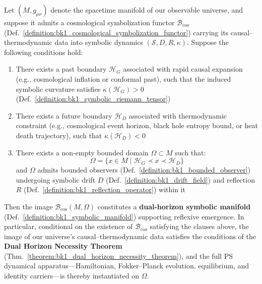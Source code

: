 \begin{theorem}
\label{theorem:bk1_dual_horizon_cosmogenesis}
Let $(M, g_{\mu\nu})$ denote the spacetime manifold of our observable universe, and
suppose it admits a cosmological symbolization functor $\mathcal{B}_{\mathrm{cos}}$
(Def.~\ref{definition:bk1_cosmological_symbolization_functor}) carrying its
causal--thermodynamic data into symbolic dynamics $(\mathcal{S}, D, R, \kappa)$.
Suppose the following conditions hold:

\begin{enumerate}
    \item There exists a past boundary $\mathcal{H}_G$ associated with rapid causal expansion (e.g., cosmological inflation or conformal past), such that the induced symbolic curvature satisfies $\kappa(\mathcal{H}_G) > 0$ (Def.~\ref{definition:bk1_symbolic_riemann_tensor})

    \item There exists a future boundary $\mathcal{H}_D$ associated with thermodynamic constraint (e.g., cosmological event horizon, black hole entropy bound, or heat death trajectory), such that $\kappa(\mathcal{H}_D) < 0$

    \item There exists a non-empty bounded domain $\Omega \subset M$ such that:
    \[
    \Omega = \{ x \in M \mid \mathcal{H}_G \prec x \prec \mathcal{H}_D \}
    \]
    and $\Omega$ admits bounded observers (Def.~\ref{definition:bk1_bounded_observer}) undergoing symbolic drift $D$ (Def.~\ref{definition:bk1_drift_field}) and reflection $R$ (Def.~\ref{definition:bk1_reflection_operator}) within it
\end{enumerate}

Then the image $\mathcal{B}_{\mathrm{cos}}(M,\Omega)$ constitutes a \textbf{dual-horizon symbolic manifold} (Def.~\ref{definition:bk1_symbolic_manifold}) supporting reflexive emergence. In particular, conditional on the existence of $\mathcal{B}_{\mathrm{cos}}$ satisfying the clauses above, the image of our universe's causal--thermodynamic data satisfies the conditions of the \textbf{Dual Horizon Necessity Theorem} (Thm.~\ref{theorem:bk1_dual_horizon_necessity_theorem}), and the full PS dynamical apparatus---Hamiltonian, Fokker--Planck evolution, equilibrium, and identity carriers---is thereby instantiated on $\Omega$.
\end{theorem}

